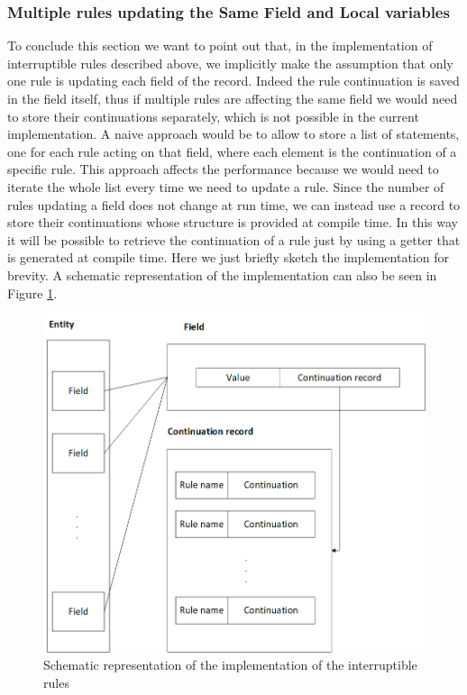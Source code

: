 \subsubsection{Multiple rules updating the Same Field and Local variables}
To conclude this section we want to point out that, in the implementation of interruptible rules described above, we implicitly make the assumption that only one rule is updating each field of the record. Indeed the rule continuation is saved in the field itself, thus if multiple rules are affecting the same field we would need to store their continuations separately, which is not possible in the current implementation. A naive approach would be to allow to store a list of statements, one for each rule acting on that field, where each element is the continuation of a specific rule. This approach affects the performance because we would need to iterate the whole list every time we need to update a rule. Since the number of rules updating a field does not change at run time, we can instead use a record to store their continuations whose structure is provided at compile time. In this way it will be possible to retrieve the continuation of a rule just by using a getter that is generated at compile time. Here we just briefly sketch the implementation for brevity. A schematic representation of the implementation can also be seen in Figure \ref{fig:ch_networking_interruptible_rules}.

\begin{figure}
  \centering
  \includegraphics[width=\textwidth]{Figures/chapter_networking/interruptible_rules}
  \caption{Schematic representation of the implementation of the interruptible rules}
  \label{fig:ch_networking_interruptible_rules}
\end{figure}

